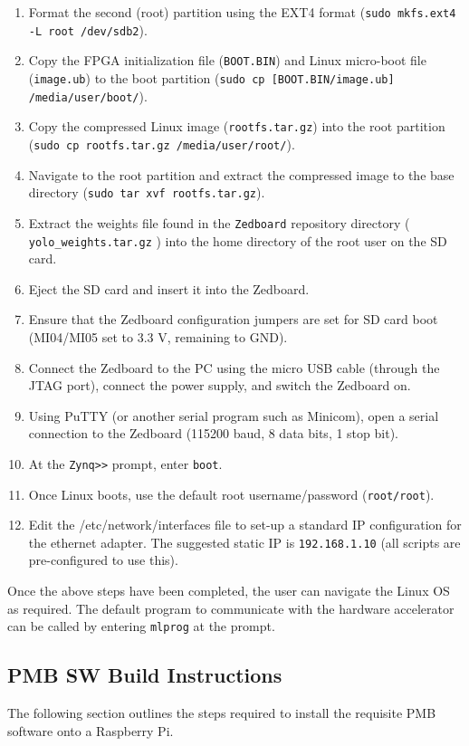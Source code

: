 \documentclass[10pt,letterpaper]{article}
\begin{document}
\begin{enumerate}
\item Format the second (root) partition using the EXT4 format (\texttt{sudo mkfs.ext4 -L root /dev/sdb2}).
\item Copy the FPGA initialization file (\texttt{BOOT.BIN}) and Linux micro-boot file (\texttt{image.ub}) to the boot partition (\texttt{sudo cp [BOOT.BIN/image.ub] /media/user/boot/}).
\item Copy the compressed Linux image (\texttt{rootfs.tar.gz}) into the root partition (\texttt{sudo cp rootfs.tar.gz /media/user/root/}). 
\item Navigate to the root partition and extract the compressed image to the base directory (\texttt{sudo tar xvf rootfs.tar.gz}).
\item Extract the weights file found in the \texttt{Zedboard\/} repository directory ( \texttt{yolo\_weights.tar.gz} ) into the home directory of the root user on the SD card.
\item Eject the SD card and insert it into the Zedboard.
\item Ensure that the Zedboard configuration jumpers are set for SD card boot (MI04/MI05 set to 3.3 V, remaining to GND).
\item Connect the Zedboard to the PC using the micro USB cable (through the JTAG port), connect the power supply, and switch the Zedboard on.
\item Using PuTTY (or another serial program such as Minicom), open a serial connection to the Zedboard (115200 baud, 8 data bits, 1 stop bit).
\item At the \texttt{Zynq>>} prompt, enter \texttt{boot}.
\item Once Linux boots, use the default root username/password (\texttt{root/root}).
\item Edit the /etc/network/interfaces file to set-up a standard IP configuration for the ethernet adapter. The suggested static IP is \texttt{192.168.1.10} (all scripts are pre-configured to use this).
\end{enumerate}

Once the above steps have been completed, the user can navigate the Linux OS as required. The default program to communicate with the hardware accelerator can be called by entering \texttt{mlprog} at the prompt.

\subsection{PMB SW Build Instructions}
The following section outlines the steps required to install the requisite PMB software onto a Raspberry Pi.
\end{document}
